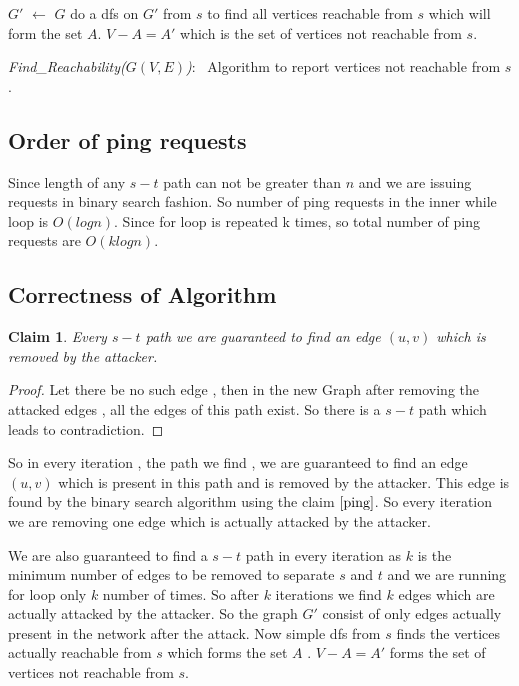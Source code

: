 \documentclass[11pt]{article}
\newtheorem{claim}[theorem]{Claim}
\begin{document}
\begin{algorithm}[h]
$G'$ $\leftarrow$ $G$ \;
do a dfs on $G'$ from $s$ to find all vertices reachable from $s$ which will form the set $A$. \;
$V-A = A'$ which is the set of vertices not reachable from $s$. \;
\caption{{\em Find\_Reachability($G(V,E)$)}:~
Algorithm to report vertices not reachable from $s$.
}
\label{Algorithm}
\end{algorithm}
\subsection*{Order of ping requests}
Since length of any $s-t$ path can not be greater than $n$ and we are issuing requests in binary search fashion. 
So number of ping requests in the inner while loop is $O(log n)$.
Since for loop is repeated k times, so total number of ping requests are $O(k logn)$.

\subsection*{Correctness of Algorithm}
\begin{claim}
Every $s-t$ path we are guaranteed to find an edge $(u,v)$ which is removed by the attacker.
\end{claim}
\begin{proof}
Let there be no such edge , then in the new Graph after removing the attacked edges , all the edges of this path exist. So there is a $s-t$ path which leads to contradiction. 
\end{proof}

So in every iteration , the path we find , we are guaranteed to find an edge $(u,v)$ which is present in this path and is removed by the attacker. This edge is found by the binary search algorithm using the claim $\ref{ping}$. So every iteration we are removing one edge which is actually attacked by the attacker. 

We are also guaranteed to find a $s-t$ path in every iteration as $k$ is the minimum number of edges to be removed to separate $s$ and $t$ and we are running for loop only $k$ number of times. So after $k$ iterations we find $k$ edges which are actually attacked by the attacker. So the graph $G'$ consist of only edges actually present in the network after the attack. Now simple dfs from $s$ finds the vertices actually reachable from $s$ which forms the set $A$ . $V-A=A'$ forms the set of vertices not reachable from $s$.
\end{document}
